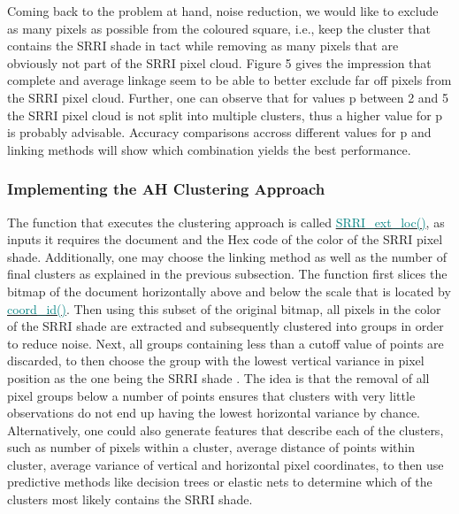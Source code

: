\documentclass[aodsor,preprint]{imsart}
\numberwithin{equation}{section}
\theoremstyle{plain}
\begin{document}
Coming back to the problem at hand, noise reduction, we would like to exclude as many pixels as possible from the coloured square, i.e., keep the cluster that contains the SRRI shade in tact while removing as many pixels that are obviously not part of the SRRI pixel cloud. Figure 5 gives the impression that complete and average linkage seem to be able to better exclude far off pixels from the SRRI pixel cloud. Further, one can observe that for values p between 2 and 5 the SRRI pixel cloud is not split into multiple clusters, thus a higher value for p is probably advisable. Accuracy comparisons accross different values for p and linking methods will show which combination yields the best performance.\newpage

\subsubsection{Implementing the AH Clustering Approach}
The function that executes the clustering approach is called \href{https://github.com/Base-R-Best-R/KID/blob/main/Code/Package/KIDs/R/SRRI_ext_loc.R}{\textcolor{teal}{SRRI\_ext\_loc()}}, as inputs it requires the document and the Hex code of the color of the SRRI pixel shade. Additionally, one may choose the linking method as well as the number of final clusters as explained in the previous subsection. The function first slices the bitmap of the document horizontally above and below the scale that is located by \href{https://github.com/Base-R-Best-R/KID/blob/main/Code/Package/KIDs/R/coord_id.R}{\textcolor{teal}{coord\_id()}}. Then using this subset of the original bitmap, all pixels in the color of the SRRI shade are extracted and subsequently clustered into groups in order to reduce noise. Next, all groups containing less than a cutoff value of points are discarded, to then choose the group with the lowest vertical variance in pixel position as the one being the SRRI shade \citep{datatable}. The idea is that the removal of all pixel groups below a number of points ensures that clusters with very little observations do not end up having the lowest horizontal variance by chance. Alternatively, one could also generate features that describe each of the clusters, such as number of pixels within a cluster, average distance of points within cluster, average variance of vertical and horizontal pixel coordinates, to then use predictive methods like decision trees or elastic nets to determine which of the clusters most likely contains the SRRI shade.
\end{document}
